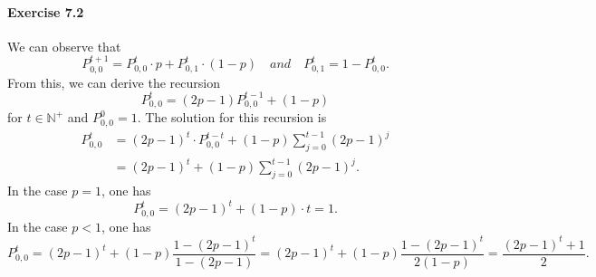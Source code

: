 \paragraph{Exercise 7.2} We can observe that
\[
  P_{0,0}^{t+1} = P_{0,0}^t \cdot p + P_{0,1}^t \cdot (1 - p)
  \quad and \quad
  P_{0,1}^t = 1 - P_{0,0}^t.
\]
From this, we can derive the recursion
\[
  P_{0,0}^{t} = (2p-1)P_{0,0}^{t-1} + (1-p)
\]
for $t \in \mathbb{N}^+$ and $P_{0,0}^0 = 1$. The solution for this recursion is
\begin{align*}
  P_{0,0}^t
  &= (2p-1)^{t} \cdot P_{0,0}^{t-t} + (1-p) \sum_{j=0}^{t-1}(2p-1)^j \\
  &= (2p-1)^{t} + (1-p) \sum_{j=0}^{t-1}(2p-1)^j.
\end{align*}
In the case $p = 1$, one has
\[
  P_{0,0}^t
    = (2p-1)^{t} + (1-p) \cdot t
    = 1.
\]
In the case $p < 1$, one has
\[
  P_{0,0}^t
    = (2p-1)^{t} + (1-p) \frac{1-(2p-1)^{t}}{1-(2p-1)}
    = (2p-1)^{t} + (1-p) \frac{1-(2p-1)^{t}}{2(1-p)}
    = \frac{(2p-1)^{t} + 1}{2}.
\]
